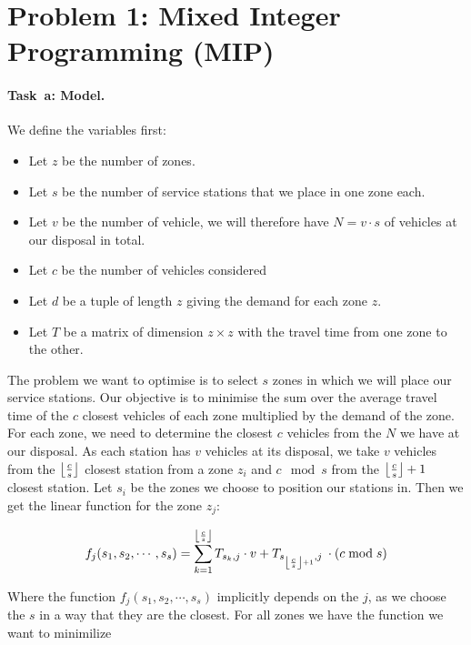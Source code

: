 \section*{Problem 1: Mixed Integer Programming (MIP)}

\newcommand{\SolverMIP}{\todo{Gurobi}\xspace}  %
\newcommand{\TimeoutMIP}{\todo{300.00}}  %

\paragraph{Task~a: Model.}
We define the variables first:
\begin{itemize}
  \item Let $z$ be the number of zones.
  \item Let $s$ be the number of service stations that we place in one zone each. 
  \item Let $v$ be the number of vehicle, we will therefore have $N = v \cdot s$ of vehicles at our disposal in total.
  \item Let $c$ be the number of vehicles considered
  \item Let $d$ be a tuple of length $z$ giving the demand for each zone $z$.
  \item Let $T$ be a matrix of dimension $z \times z$ with the travel time from one zone to the other.
\end{itemize}
The problem we want to optimise is to select $s$ zones in which we will place our service stations. Our objective is to minimise the sum over the average travel time of the $c$ closest vehicles of each zone multiplied by the demand of the zone. For each zone, we need to determine the closest $c$ vehicles from the $N$ we have at our disposal. As each station has $v$ vehicles at its disposal, we take $v$ vehicles from the  $\left\lfloor\frac{c}{s}\right\rfloor$ closest station from a zone $z_i$ and $c \mod s$ from the $\left\lfloor\frac{c}{s}\right\rfloor + 1$ closest station. 
Let $s_i$ be the zones we choose to position our stations in. Then we get the linear function for the zone $z_j$: 

\begin{equation*}
	f_j(s_1, s_2, \cdots, s_s) = \sum_{k=1}^{\left\lfloor\frac{c}{s}\right\rfloor} T_{s_k, j} \cdot v +  T_{s_{\left\lfloor\frac{c}{s}\right\rfloor + 1}, j} \:\cdot(c \bmod s)
\end{equation*}

Where the function $f_j(s_1, s_2, \cdots, s_s)$ implicitly depends on the $j$, as we choose the $s$ in a way that they are the closest. For all zones we have the function we want to minimilize

